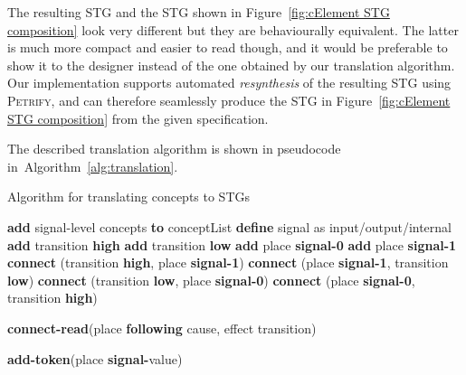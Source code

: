 \documentclass[british, journal]{IEEEtran}
\newcommand{\noun}[1]{\textsc{#1}}
\begin{document}
The resulting STG and the STG shown in Figure~\ref{fig:cElement STG composition}
look very different but they are behaviourally equivalent. The latter is much more
compact and easier to read though, and it would be preferable to show it to the
designer instead of the one obtained by our translation algorithm. Our
implementation supports automated \emph{resynthesis} of the resulting STG
using \noun{Petrify}, and can therefore seamlessly produce the STG in
Figure~\ref{fig:cElement STG composition} from the given specification.




The described translation algorithm is shown in pseudocode
in~Algorithm~\ref{alg:translation}.

\begin{algorithm}[t]
\begin{algorithmic}
\caption{Algorithm for translating concepts to STGs\label{alg:translation}}
  \State \textbf{add} signal-level concepts \textbf{to} conceptList
\EndFor
  \State \textbf{define} signal as input/output/internal
  \State \textbf{add} transition \textbf{high}
  \State \textbf{add} transition \textbf{low}
  \State \textbf{add} place \textbf{signal-0}
  \State \textbf{add} place \textbf{signal-1}
  \State \textbf{connect} (transition \textbf{high}, place \textbf{signal-1})
  \State \textbf{connect} (place \textbf{signal-1}, transition \textbf{low})
  \State \textbf{connect} (transition \textbf{low}, place \textbf{signal-0})
  \State \textbf{connect} (place \textbf{signal-0}, transition \textbf{high})
\EndFor

  \State \textbf{connect-read}(place \textbf{following} cause, effect transition)
\EndFor

  \State \textbf{add-token}(place \textbf{signal-}value)
\EndFor

\end{algorithmic}
\end{algorithm}
\end{document}
